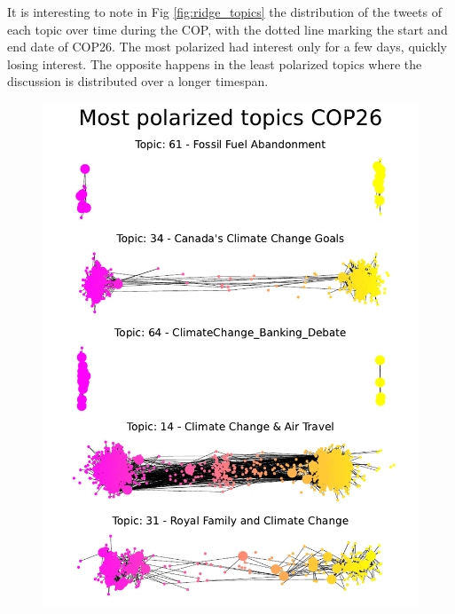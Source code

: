 It is interesting to note in Fig \ref{fig:ridge_topics} the distribution of the tweets of each topic over time during the COP, with the dotted line marking the start and end date of COP26. The most polarized had interest only  for a few days, quickly losing  interest. The opposite happens in the least polarized topics where the discussion is distributed over a longer timespan.



\begin{figure}[H]
    \centering
    \begin{minipage}{0.50\textwidth}
        \centering
         \includegraphics[width=0.98\linewidth]{Chapter5/figures/Most polarized topics COP26.pdf}
        

\end{minipage}
\end{figure}
